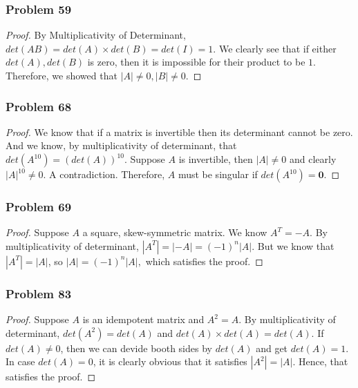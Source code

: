 \documentclass[a4paper,12pt]{article}
\begin{document}
\subsubsection*{Problem 59}
\begin{proof}
    By Multiplicativity of Determinant, $det(AB)=det(A)\times det(B)=det(I)=1.$ We clearly see that if either $det(A),det(B)$ is zero, then it is impossible for their product to be $1$. Therefore, we showed that $|A|\neq 0, |B| \neq 0.$
\end{proof}
\subsubsection*{Problem 68}
\begin{proof}
    
We know that if a matrix is invertible then its determinant cannot be zero. And we know, by multiplicativity of determinant, that $det(A^{10})=(det(A))^{10}.$ Suppose $A$ is invertible, then $|A|\neq 0$ and clearly $|A|^{10}\neq 0.$ A contradiction. Therefore, $A$ must be singular if $det(A^{10})=\textbf{0}.$
\end{proof}
\subsubsection*{Problem 69}
\begin{proof}
    Suppose $A$ a square, skew-symmetric matrix. We know $A^T=-A$. By multiplicativity of determinant, $|A^T|=|-A|= (-1)^n|A|.$ But we know that $|A^T|=|A|$, so $|A|=(-1)^n|A|,$ which satisfies the proof.
\end{proof}
\subsubsection*{Problem 83}
\begin{proof}
    Suppose $A$ is an idempotent matrix and $A^2=A$. By multiplicativity of determinant, $det(A^2)=det(A)$ and $det(A)\times det(A)=det(A).$ If $det(A)\neq 0$, then we can devide booth sides by $det(A)$ and get $det(A)=1$. In case $det(A)=0$, it is clearly obvious that it satisfies $|A^2|=|A|.$ Hence, that satisfies the proof.
\end{proof}
\end{document}
